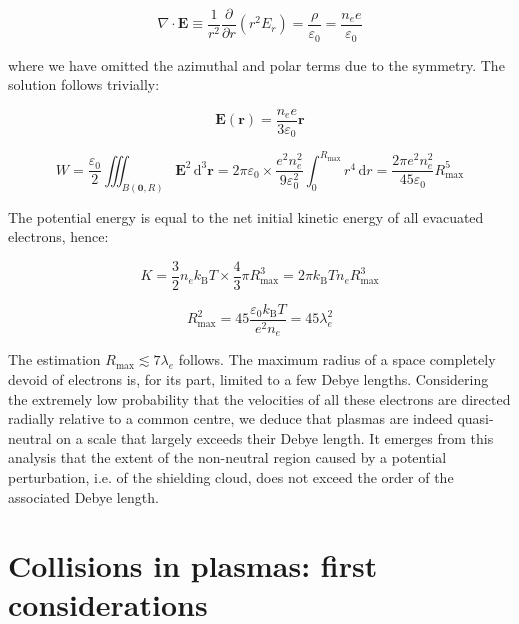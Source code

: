 \begin{equation*}
    \nabla\cdot\mathbf{E}\equiv\frac{1}{r^2}\frac{\partial}{\partial r}\left(r^2E_r\right)=\frac{\rho}{\varepsilon_0}=\frac{n_ee}{\varepsilon_0}
\end{equation*}

where we have omitted the azimuthal and polar terms due to the symmetry. The solution follows trivially:

\begin{equation*}
    \mathbf{E}(\mathbf{r})=\frac{n_ee}{3\varepsilon_0}\mathbf{r}
\end{equation*}

\begin{equation*}
    W=\frac{\varepsilon_0}{2}\iiint_{B(\mathbf{0},R)}\mathbf{E}^2\,\mathrm{d}^3\mathbf{r}=2\pi\varepsilon_0\times\frac{e^2n_e^2}{9\varepsilon_0^2}\int_0^{R_\text{max}}r^4\,\mathrm{d}r=\frac{2\pi e^2n_e^2}{45\varepsilon_0} R_\text{max}^5
\end{equation*}

The potential energy is equal to the net initial kinetic energy of all evacuated electrons, hence:

\begin{equation*}
    K=\frac{3}{2}n_ek_\mathrm{B}T\times\frac{4}{3}\pi R_{\text{max}}^3 = 2\pi k_\mathrm{B}Tn_eR_\text{max}^3
\end{equation*}

\begin{equation*}
    R_\text{max}^2=45\frac{\varepsilon_0k_\mathrm{B}T}{e^2n_e}=45\lambda_e^2
\end{equation*}

The estimation $R_\text{max}\lesssim7\lambda_e$ follows. The maximum radius of a space completely devoid of electrons is, for its part, limited to a few Debye lengths. Considering the extremely low probability that the velocities of all these electrons are directed radially relative to a common centre, we deduce that plasmas are indeed quasi-neutral on a scale that largely exceeds their Debye length. It emerges from this analysis that the extent of the non-neutral region caused by a potential perturbation, i.e. of the shielding cloud, does not exceed the order of the associated Debye length.

\section{Collisions in plasmas: first considerations}

